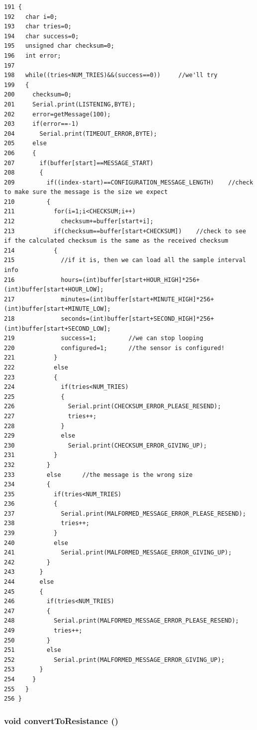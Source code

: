 \begin{Code}\begin{verbatim}191 { 
192   char i=0;
193   char tries=0;
194   char success=0;
195   unsigned char checksum=0;
196   int error;
197 
198   while((tries<NUM_TRIES)&&(success==0))     //we'll try
199   {
200     checksum=0;
201     Serial.print(LISTENING,BYTE);
202     error=getMessage(100);
203     if(error==-1)
204       Serial.print(TIMEOUT_ERROR,BYTE);
205     else
206     {
207       if(buffer[start]==MESSAGE_START)
208       {
209         if((index-start)==CONFIGURATION_MESSAGE_LENGTH)    //check to make sure the message is the size we expect
210         {
211           for(i=1;i<CHECKSUM;i++)
212             checksum+=buffer[start+i];
213           if(checksum==buffer[start+CHECKSUM])    //check to see if the calculated checksum is the same as the received checksum
214           {
215             //if it is, then we can load all the sample interval info
216             hours=(int)buffer[start+HOUR_HIGH]*256+(int)buffer[start+HOUR_LOW];
217             minutes=(int)buffer[start+MINUTE_HIGH]*256+(int)buffer[start+MINUTE_LOW];
218             seconds=(int)buffer[start+SECOND_HIGH]*256+(int)buffer[start+SECOND_LOW];
219             success=1;         //we can stop looping
220             configured=1;      //the sensor is configured!
221           }
222           else
223           {
224             if(tries<NUM_TRIES)
225             {
226               Serial.print(CHECKSUM_ERROR_PLEASE_RESEND);
227               tries++;
228             }
229             else
230               Serial.print(CHECKSUM_ERROR_GIVING_UP);
231           }
232         }
233         else      //the message is the wrong size
234         {
235           if(tries<NUM_TRIES)
236           {
237             Serial.print(MALFORMED_MESSAGE_ERROR_PLEASE_RESEND);
238             tries++;
239           }
240           else
241             Serial.print(MALFORMED_MESSAGE_ERROR_GIVING_UP);
242         }
243       }
244       else
245       {
246         if(tries<NUM_TRIES)
247         {
248           Serial.print(MALFORMED_MESSAGE_ERROR_PLEASE_RESEND);
249           tries++;
250         }
251         else
252           Serial.print(MALFORMED_MESSAGE_ERROR_GIVING_UP);
253       }
254     }
255   }
256 }
\end{verbatim}
\end{Code}


\hypertarget{temperature__sensor___terciopelo_8pde_8e666a34a083b1806167ca991be0c436}{
\subsubsection[{convertToResistance}]{\setlength{\rightskip}{0pt plus 5cm}void convertToResistance ()}}
\label{temperature__sensor___terciopelo_8pde_8e666a34a083b1806167ca991be0c436}


